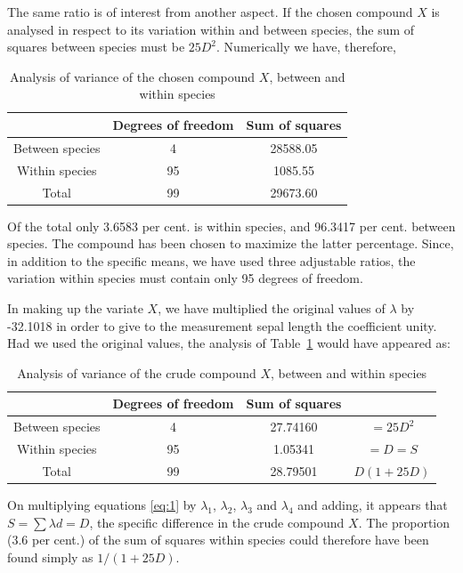 \documentclass[12pt]{article}
\begin{document}
The same ratio is of interest from another aspect. If the chosen compound $X$ is analysed
in respect to its variation within and between species, the sum of squares between species
must be $25 D^2$. Numerically we have, therefore,

\begin{table}[H]
\centering
\footnotesize
\caption{Analysis of variance of the chosen compound $X$, between and within species}
\label{tab:5}
\begin{tabular}{|c|c|c|}
\hline
 & Degrees of freedom & Sum of squares \\
\hline
Between species & 4  & 28588.05 \\
Within species  & 95 & 1085.55  \\
\hline
Total           & 99 & 29673.60 \\
\hline
\end{tabular}
\end{table}

Of the total only 3.6583 per cent. is within species, and 96.3417 per cent. between species.
The compound has been chosen to maximize the latter percentage. Since, in addition to
the specific means, we have used three adjustable ratios, the variation within species
must contain only 95 degrees of freedom.

In making up the variate $X$, we have multiplied the original values of $\lambda$ by -32.1018
in order to give to the measurement sepal length the coefficient unity. Had we used the
original values, the analysis of Table~\ref{tab:5} would have appeared as:

\begin{table}[H]
\centering
\footnotesize
\caption{Analysis of variance of the crude compound $X$, between and within species}
\label{tab:6}
\begin{tabular}{|c|c|c|c|}
\hline
 & Degrees of freedom & Sum of squares & \\
\hline
Between species & 4  & 27.74160 & $=25 D^2$ \\
Within species  & 95 & 1.05341  & $=D=S$ \\
\hline
Total           & 99 & 28.79501 & $D(1+25D)$ \\
\hline
\end{tabular}
\end{table}

On multiplying equations \eqref{eq:1} by $\lambda_{1}$, $\lambda_{2}$, $\lambda_{3}$ and $\lambda_{4}$ and adding, it appears that
$S = \sum{\lambda d} = D$, the specific difference in the crude compound $X$.
The proportion (3.6 per cent.) of the sum of squares within species could therefore have been found simply as $1 / (1 + 25 D)$.
\end{document}
